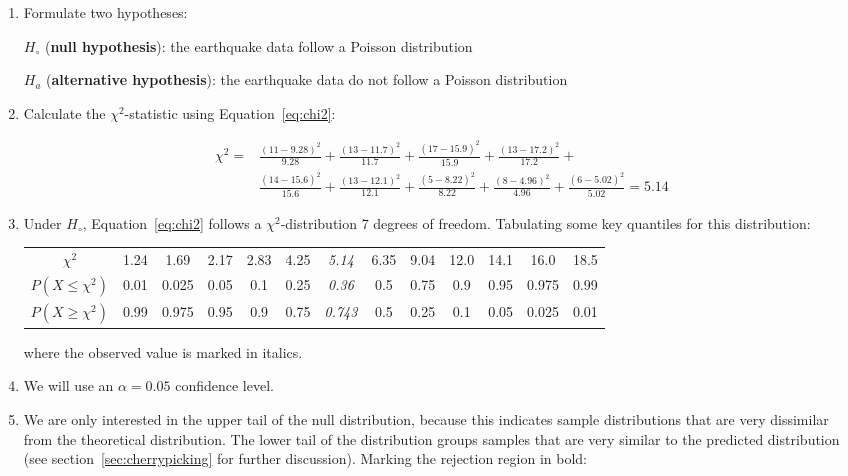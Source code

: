 \begin{enumerate}
\item  Formulate two hypotheses:

  $H_\circ$ (\textbf{null hypothesis}):
  the earthquake data follow a Poisson distribution

  $H_a$ (\textbf{alternative hypothesis}):
  the earthquake data do not follow a Poisson distribution
  
\item Calculate the $\chi^2$-statistic using Equation~\ref{eq:chi2}:

  \begin{equation}
    \begin{split}
      \chi^2 = &
      \frac{(11-9.28)^2}{9.28} + \frac{(13-11.7)^2}{11.7} +
      \frac{(17-15.9)^2}{15.9} + \frac{(13-17.2)^2}{17.2} + \\
      & \frac{(14-15.6)^2}{15.6} + \frac{(13-12.1)^2}{12.1} +
      \frac{(5-8.22)^2}{8.22} + \frac{(8-4.96)^2}{4.96} +
      \frac{(6-5.02)^2}{5.02} = 5.14
    \end{split}
  \end{equation}

\item Under $H_\circ$, Equation~\ref{eq:chi2} follows a
  $\chi^2$-distribution 7 degrees of freedom. Tabulating some key
  quantiles for this distribution:

  \begin{center}
    \begin{tabular}{c|c@{\gap}c@{\gap}c@{\gap}c@{\gap}
        c@{\gap}c@{\gap}c@{\gap}c@{\gap}c@{\gap}c@{\gap}c@{\gap}c}
      $\chi^2$ & 1.24 & 1.69 & 2.17 & 2.83 & 4.25 & \emph{5.14} &
      6.35 & 9.04 & 12.0 & 14.1 & 16.0 & 18.5 \\
      $P(X\leq{\chi^2})$ & 0.01 & 0.025 & 0.05 & 0.1 & 0.25 &
      \emph{0.36} & 0.5 & 0.75 & 0.9 & 0.95 & 0.975 & 0.99 \\
      $P(X\geq{\chi^2})$ & 0.99 & 0.975 & 0.95 & 0.9 & 0.75 &
      \emph{0.743} & 0.5 & 0.25 & 0.1 & 0.05 & 0.025 & 0.01
    \end{tabular}
  \end{center}

  \noindent where the observed value is marked in italics.
  
\item We will use an $\alpha = 0.05$ confidence level.

\item We are only interested in the upper tail of the null
  distribution, because this indicates sample distributions that are
  very dissimilar from the theoretical distribution. The lower tail of
  the distribution groups samples that are very similar to the
  predicted distribution (see section~\ref{sec:cherrypicking} for
  further discussion). Marking the rejection region in bold:
  

\end{enumerate}
